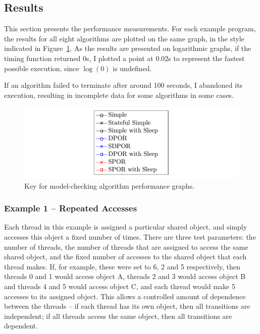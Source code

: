 \documentclass[12pt,a4paper,twoside,openright]{report}
\begin{document}
\subsection{Results}
This section presents the performance measurements.
For each example program, the results for all eight
algorithms are plotted on the same graph, in the
style indicated in Figure~\ref{fig:key}.
As the results are
presented on logarithmic graphs, if the timing function
returned 0s, I plotted a point at 0.02s
to represent the fastest possible execution, since
$\log(0)$ is undefined.

If an algorithm failed to terminate after around
100 seconds, I abandoned its execution,
resulting in incomplete data
for some algorithms in some cases.

\begin{figure}
	\includegraphics[width=\textwidth]{key}
	\caption{Key for model-checking algorithm performance graphs.}
	\label{fig:key}
\end{figure}

\subsubsection{Example 1 -- Repeated Accesses}
Each thread in this example is assigned a particular
shared object, and simply accesses this object a
fixed number of times. There are three test parameters:
the number of threads, the number of threads that are
assigned to access the same shared object, and the fixed
number of accesses to the shared object that each thread
makes. If, for example, these were set to 6, 2 and 5
respectively, then threads 0 and 1 would access object A,
threads 2 and 3 would access object B and threads 4 and 5
would access object C, and each thread would make 5 accesses
to its assigned object. This allows a controlled amount of
dependence between the threads -- if each thread has its own
object, then all transitions are independent; if all threads
access the same object, then all transitions are dependent.
\end{document}
